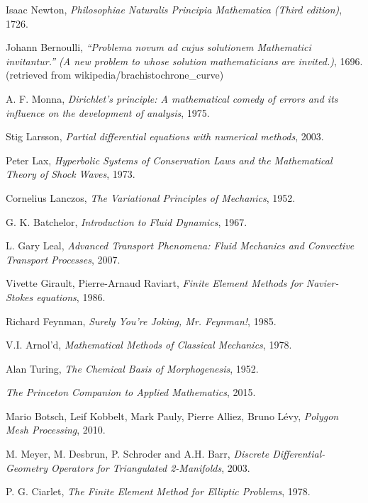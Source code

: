 \documentclass[11pt,a4paper]{memoir}
\begin{document}
\begin{thebibliography}{9}

Isaac Newton,
\textit{Philosophiae Naturalis Principia Mathematica (Third edition)},
1726.

Johann Bernoulli,
\textit{``Problema novum ad cujus solutionem Mathematici invitantur.'' (A new problem to whose solution mathematicians are invited.)},
1696.
(retrieved from wikipedia/brachistochrone\_curve)

A. F. Monna,
\textit{Dirichlet's principle: A mathematical comedy of errors and its influence on the development of analysis},
1975.

Stig Larsson,
\textit{Partial differential equations with numerical methods},
2003.

Peter Lax,
\textit{Hyperbolic Systems of Conservation Laws and the Mathematical Theory of Shock Waves},
1973.

Cornelius Lanczos,
\textit{The Variational Principles of Mechanics},
1952.

G. K. Batchelor,
\textit{Introduction to Fluid Dynamics},
1967.

L. Gary Leal,
\textit{Advanced Transport Phenomena: Fluid Mechanics and Convective Transport Processes},
2007.

Vivette Girault, Pierre-Arnaud Raviart,
\textit{Finite Element Methods for Navier-Stokes equations},
1986.

Richard Feynman,
\textit{Surely You're Joking, Mr. Feynman!},
1985.

V.I. Arnol'd,
\textit{Mathematical Methods of Classical Mechanics},
1978.

Alan Turing,
\textit{The Chemical Basis of Morphogenesis},
1952.

\textit{The Princeton Companion to Applied Mathematics},
2015.

Mario Botsch, Leif Kobbelt, Mark Pauly, Pierre Alliez, Bruno L\'evy,
\textit{Polygon Mesh Processing},
2010.

M. Meyer, M. Desbrun,  P. Schroder and A.H. Barr,
\textit{Discrete Differential-Geometry Operators for Triangulated 2-Manifolds},
2003.

P. G. Ciarlet,
\textit{The Finite Element Method for Elliptic Problems},
1978.


\end{thebibliography}
\end{document}

